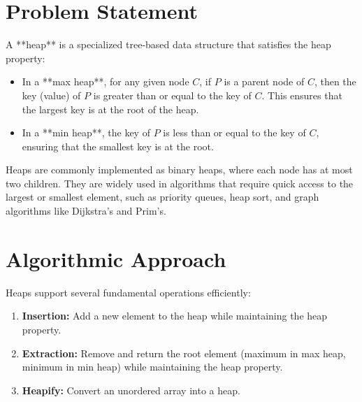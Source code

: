 
\label{problem:heaps}

\section*{Problem Statement}

A **heap** is a specialized tree-based data structure that satisfies the heap property:

\begin{itemize}
    \item In a **max heap**, for any given node \( C \), if \( P \) is a parent node of \( C \), then the key (value) of \( P \) is greater than or equal to the key of \( C \). This ensures that the largest key is at the root of the heap.
    \item In a **min heap**, the key of \( P \) is less than or equal to the key of \( C \), ensuring that the smallest key is at the root.
\end{itemize}

Heaps are commonly implemented as binary heaps, where each node has at most two children. They are widely used in algorithms that require quick access to the largest or smallest element, such as priority queues, heap sort, and graph algorithms like Dijkstra's and Prim's.

\section*{Algorithmic Approach}

Heaps support several fundamental operations efficiently:

\begin{enumerate}
    \item \textbf{Insertion:} Add a new element to the heap while maintaining the heap property.
    \item \textbf{Extraction:} Remove and return the root element (maximum in max heap, minimum in min heap) while maintaining the heap property.
    \item \textbf{Heapify:} Convert an unordered array into a heap.
\end{enumerate}

